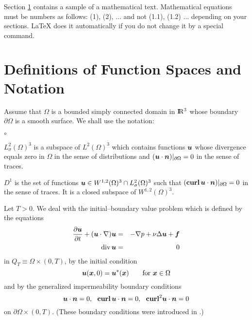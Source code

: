 \documentclass[twocolumn,11pt]{article}
\newcommand{\R}{{\rm I}\!{\rm R}} %
\newcommand{\bff}{\mbox{\boldmath $f$}}
\newcommand{\bfn}{\mbox{\boldmath $n$}}
\newcommand{\bfu}{\mbox{\boldmath $u$}}
\newcommand{\bfx}{\mbox{\boldmath $x$}}
\newcommand{\bfcurl}{{\bf curl}} %
\newcommand{\rmdiv}{{\rm div}} %
\begin{document}
Section \ref{S2} contains a sample of a mathematical text.
Mathematical equations must be numbers as follows: (1), (2),
$\dots$ and not (1.1), (1.2) $\dots$ depending on your sections.
LaTeX does it automatically if you do not change it by a special
command.

\section{Definitions of Function Spaces and Notation}
\label{S2} \vspace{-4pt}

Assume that $\Omega$ is a bounded simply connected domain in
$\R^3$ whose boundary $\partial\Omega$ is a smooth surface. We
shall use the notation:

\begin{list}{$\circ$}
{\setlength{\topsep 1pt}
\setlength{\itemsep 1pt}
\setlength{\leftmargin 8pt}
\setlength{\labelwidth 6pt}}

\item
$L_{\sigma}^2(\Omega)^3$ is a subspace of $L^2(\Omega)^3$ which
contains functions $\bfu$ whose divergence equals zero in $\Omega$
in the sense of distributions and $(\bfu\cdot\bfn)|_{\partial
\Omega}=0$ in the sense of traces.

\item
$D^1$ is the set of functions $\bfu\in W^{1,2}(\Omega)^3\cap
L_{\sigma}^2(\Omega)^3$ such that $(\bfcurl\, \bfu\cdot
\bfn)|_{\partial\Omega}=0$ in the sense of traces. It is a closed
subspace of $W^{1,2}(\Omega)^3$.
\end{list}

Let $T>0$. We deal with the initial--boundary value problem which
is defined by the equations
\begin{eqnarray}
\frac{\partial\bfu}{\partial t}+(\bfu\cdot\nabla)\bfu &=& -\nabla
p+\nu\Delta\bfu+\bff \label{5} \\
\rmdiv\, \bfu &=& 0 \label{6}
\end{eqnarray}
in $Q_T\equiv\Omega\times(0,T)$, by the initial condition
\begin{equation}
\bfu(\bfx,0)=\bfu^*(\bfx) \qquad \hbox{for}\ \bfx\in\Omega
\label{7}
\end{equation}
and by the generalized impermeability boundary conditions
\begin{equation}
\bfu\cdot\bfn=0,\ \ \bfcurl\, \bfu\cdot\bfn=0,\ \
\bfcurl^2\bfu\cdot\bfn=0 \label{4}
\end{equation}
on $\partial\Omega\times(0,T)$. (These boundary conditions were
introduced in \cite{BNP}.)
\end{document}
